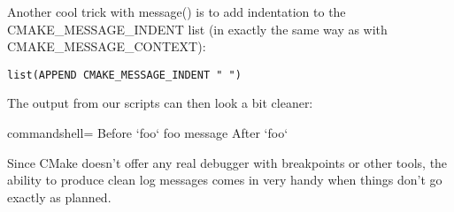 Another cool trick with message() is to add indentation to the CMAKE\_MESSAGE\_INDENT list (in exactly the same way as with CMAKE\_MESSAGE\_CONTEXT):

\begin{lstlisting}[style=styleCMake]
list(APPEND CMAKE_MESSAGE_INDENT " ")
\end{lstlisting}

The output from our scripts can then look a bit cleaner:

\begin{tcblisting}{commandshell={}}
Before `foo`
  foo message
After `foo`
\end{tcblisting}

Since CMake doesn't offer any real debugger with breakpoints or other tools, the ability to produce clean log messages comes in very handy when things don't go exactly as planned.





